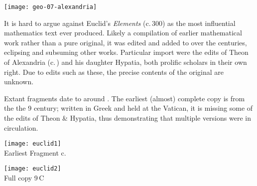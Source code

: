 \begin{center}
	\texttt{[image: geo-07-alexandria]}
\end{center}

It is hard to argue against Euclid's \emph{Elements} (c.\,300\BC{}) as the most influential mathematics text ever produced. Likely a compilation of earlier mathematical work rather than a pure original, it was edited and added to over the centuries, eclipsing and subsuming other works. Particular import were the edits of Theon of Alexandria (c.\,) and his daughter Hypatia, both prolific scholars in their own right. Due to edits such as these, the precise contents of the original are unknown.\smallbreak

Extant fragments date to around . The earliest (almost) complete copy is from the the 9\th{} century; written in Greek and held at the Vatican, it is missing some of the edits of Theon \& Hypatia, thus demonstrating that multiple versions were in circulation.

\begin{center}
	\begin{minipage}[b]{0.45\linewidth}
		\centering\texttt{[image: euclid1]}\\
		Earliest Fragment c.\,
	\end{minipage}
	\begin{minipage}[b]{0.45\linewidth}
		\centering\texttt{[image: euclid2]}\\
		Full copy 9\th\,C
	\end{minipage}
\end{center}

\goodbreak

